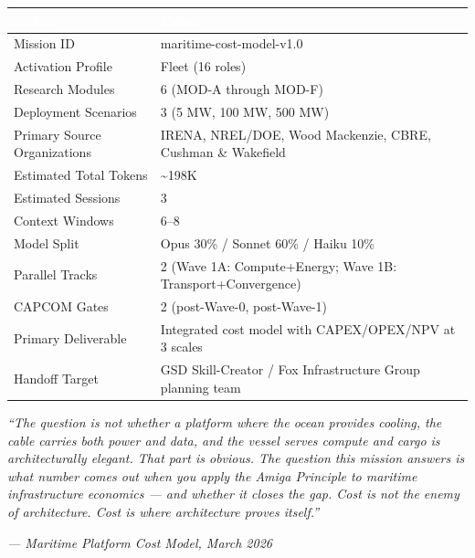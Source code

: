 \documentclass[11pt,letterpaper]{article}
\newcommand{\tableheader}[1]{\textbf{\sffamily\textcolor{white}{#1}}}
\begin{document}
\begin{center}
\begin{tabularx}{\textwidth}{L{5cm}X}
\toprule
{}
\tableheader{Metric} & \tableheader{Value} \\
\midrule
Mission ID & maritime-cost-model-v1.0 \\
Activation Profile & Fleet (16 roles) \\
Research Modules & 6 (MOD-A through MOD-F) \\
Deployment Scenarios & 3 (5 MW, 100 MW, 500 MW) \\
Primary Source Organizations & IRENA, NREL/DOE, Wood Mackenzie, CBRE, Cushman \& Wakefield \\
Estimated Total Tokens & \textasciitilde{}198K \\
Estimated Sessions & 3 \\
Context Windows & 6--8 \\
Model Split & Opus 30\% / Sonnet 60\% / Haiku 10\% \\
Parallel Tracks & 2 (Wave 1A: Compute+Energy; Wave 1B: Transport+Convergence) \\
CAPCOM Gates & 2 (post-Wave-0, post-Wave-1) \\
Primary Deliverable & Integrated cost model with CAPEX/OPEX/NPV at 3 scales \\
Handoff Target & GSD Skill-Creator / Fox Infrastructure Group planning team \\
\bottomrule
\end{tabularx}
\end{center}

\vspace{2em}

\begin{quotebox}
\textit{``The question is not whether a platform where the ocean provides cooling, the cable
carries both power and data, and the vessel serves compute and cargo is architecturally
elegant. That part is obvious. The question this mission answers is what number comes out
when you apply the Amiga Principle to maritime infrastructure economics --- and whether
it closes the gap. Cost is not the enemy of architecture. Cost is where architecture
proves itself.''}

\vspace{0.5em}
\textit{--- Maritime Platform Cost Model, March 2026}
\end{quotebox}
\end{document}
